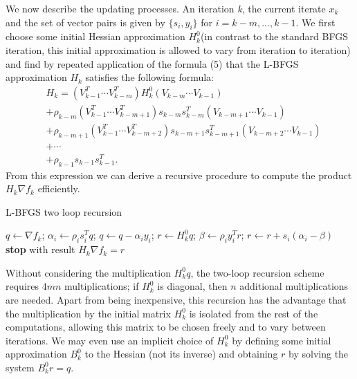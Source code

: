 We now describe the updating processes. An iteration \textit{k}, the current iterate $x_{k}$ and the set of vector pairs is given by $\{s_{i},y_{i}\}$ for $i=k-m, ..., k-1$. We first choose some initial Hessian approximation $H^0_{k}$(in contrast to the standard BFGS iteration, this initial approximation is allowed to vary from iteration to iteration) and find by repeated application of the formula (5) that the L-BFGS approximation $H_{k}$ satisfies the following formula: 
\begin{equation} 
\begin{aligned}
&H_{k}=(V^T_{k-1}\cdots V^T_{k-m})H^0_{k}(V_{k-m}\cdots V_{k-1})\\           
&+\rho_{k-m}(V^T_{k-1}\cdots V^T_{k-m+1})s_{k-m}s^T_{k-m}(V_{k-m+1}\cdots V_{k-1})\\
&+\rho_{k-m+1}(V^T_{k-1}\cdots V^T_{k-m+2})s_{k-m+1}s^T_{k-m+1}(V_{k-m+2}\cdots V_{k-1})\\
&+ \cdots \\
&+\rho_{k-1}s_{k-1}s^T_{k-1}.  
\end{aligned}
\end{equation}
From this expression we can derive a recursive procedure to compute the product $H_{k}\nabla f_{k}$ efficiently.

\begin{algorithm}[H]
	\caption{L-BFGS two loop recursion}
	\label{}
	\begin{algorithmic}[3]
	
		\State $q \gets \nabla f_{k}$;
        \State $ \alpha_{i} \gets \rho_{i}s^T_{i}q$;
        \State $q \gets q - \alpha_{i}y_{i}$; 
      \EndFor
 	  \State $r \gets H^0_{k}q$;
 	  \State $\beta \gets \rho_{i}y^T_{i}r$; 
 	  \State $r \gets r + s_{i}(\alpha_{i}-\beta)$
 	  \EndFor
	  \State \textbf{stop} with result $H_{k}\nabla f_{k}=r$
	\end{algorithmic}
\end{algorithm}
Without considering the multiplication $H^0_{k}q $, the two-loop recursion scheme requires $4mn$ multiplications; if $H^0_{k}$ is diagonal, then $n$ additional multiplications are needed. Apart from being inexpensive, this recursion has the advantage that the multiplication by the initial matrix $H^0_{k}$ is isolated from the rest of the computations, allowing this matrix to be chosen freely and to vary between iterations. We may even use an implicit choice of $H^0_{k}$ by defining some initial approximation $B^0_{k}$ to the Hessian (not its inverse) and obtaining $r$ by solving the system $B^0_{k}r = q$. 

